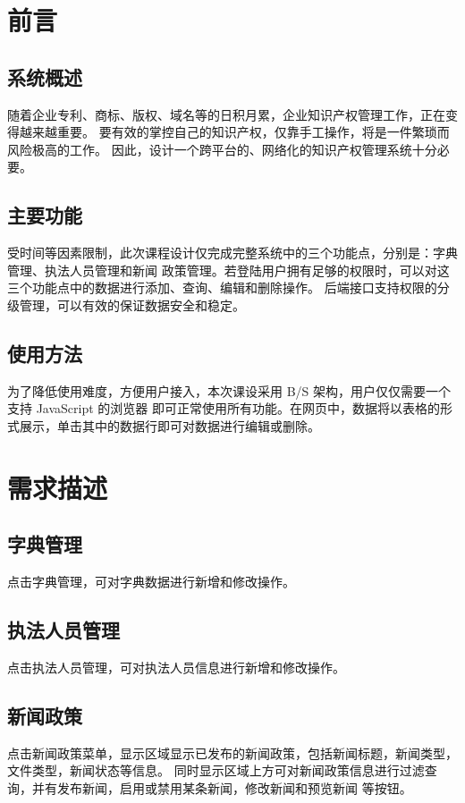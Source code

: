 \documentclass[a4paper, 12pt]{article}
\begin{document}
	\section{\large\textbf 前言}
	\subsection{\normalfont 系统概述}
	
	随着企业专利、商标、版权、域名等的日积月累，企业知识产权管理工作，正在变得越来越重要。
	要有效的掌控自己的知识产权，仅靠手工操作，将是一件繁琐而风险极高的工作。
	因此，设计一个跨平台的、网络化的知识产权管理系统十分必要。

	\subsection{\normalfont 主要功能}

	受时间等因素限制，此次课程设计仅完成完整系统中的三个功能点，分别是：字典管理、执法人员管理和新闻
	政策管理。若登陆用户拥有足够的权限时，可以对这三个功能点中的数据进行添加、查询、编辑和删除操作。
	后端接口支持权限的分级管理，可以有效的保证数据安全和稳定。

	\subsection{\normalfont\large\normalfont 使用方法}

	为了降低使用难度，方便用户接入，本次课设采用 B/S 架构，用户仅仅需要一个支持 JavaScript 的浏览器
	即可正常使用所有功能。在网页中，数据将以表格的形式展示，单击其中的数据行即可对数据进行编辑或删除。
	
	\section{\large\textbf 需求描述}
	
	\subsection{\normalfont 字典管理}
	点击字典管理，可对字典数据进行新增和修改操作。

	\subsection{\normalfont 执法人员管理}
	点击执法人员管理，可对执法人员信息进行新增和修改操作。

	\subsection{\normalfont 新闻政策}
	点击新闻政策菜单，显示区域显示已发布的新闻政策，包括新闻标题，新闻类型，文件类型，新闻状态等信息。
	同时显示区域上方可对新闻政策信息进行过滤查询，并有发布新闻，启用或禁用某条新闻，修改新闻和预览新闻
	等按钮。
\end{document}

